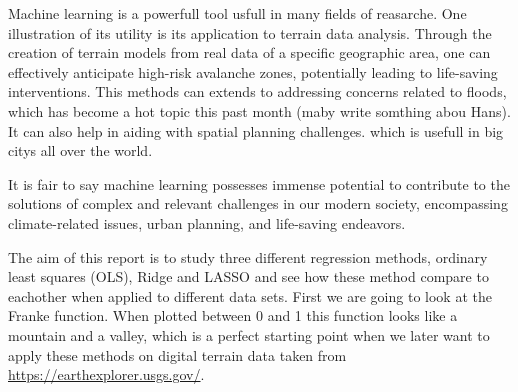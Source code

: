 \thispagestyle{plain}
\noindent Machine learning is a powerfull tool usfull in many fields of reasarche. 
One illustration of its utility is its application to terrain data analysis.
Through the creation of terrain models from real data of a specific geographic area, 
one can effectively anticipate high-risk avalanche zones, 
potentially leading to life-saving interventions. 
This methods can extends to addressing concerns related to floods, which has become 
a hot topic this past month (maby write somthing abou Hans). It can also help in aiding with spatial planning challenges. which is 
usefull in big citys all over the world.

\noindent It is fair to say machine learning possesses immense potential 
to contribute to the solutions of complex and relevant challenges 
in our modern society, encompassing climate-related issues, urban planning, 
and life-saving endeavors. \newline

\noindent The aim of this report is to study three different 
regression methods, ordinary least squares (OLS), 
Ridge and LASSO and see how these method compare to eachother when applied 
to different data sets. 
First we are going to look at the Franke function. 
When plotted between 0 and 1 this function looks like a mountain and a valley,
 which is a perfect starting point when we later want to apply these methods 
 on digital terrain data taken from \url{https://earthexplorer.usgs.gov/}.
